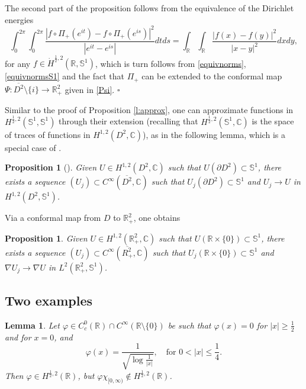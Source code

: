 \documentclass[12pt, a4paper]{article}
\newtheorem{lem}[thm]{Lemma}
\newtheorem{prop}[thm]{Proposition}
\newcommand{\sph}{\mathbb{S}}
\newcommand{\vp}{\varphi}
\newcommand{\R}{\mathbb{R}}
\newcommand{\cl}[1]{\overline{#1}}
\renewcommand{\(}{\left(}
\renewcommand{\)}{\right)}
\begin{document}
\medskip 


The second part of the proposition follows from the equivalence of the Dirichlet energies
$$\int_{0}^{2\pi}\int_{0}^{2\pi}\frac{|f\circ\Pi_+(e^{it})-f\circ\Pi_+(e^{is})|^2}{|e^{it}-e^{is}|}dtds=\int_\R\int_\R\frac{|f(x)-f(y)|^2}{|x-y|^2}dxdy,$$ for any   $f\in \dot H^{\frac12,2}(\R,\sph^1)$,
which is turn follows from \eqref{equivnorms}, \eqref{equivnormsS1} and the fact that $\Pi_+$ can be extended to the conformal map $\Psi: \cl{D^2}\setminus\{i\}\to \R^2_+$ given in \eqref{Psi}.
\hfill$\square$

\medskip

Similar to the proof of Proposition \ref{l:approx}, one can approzimate functions in $H^{\frac12,2}(\sph^1,\sph^1)$ through  their extension (recalling that $H^{\frac{1}{2},2}(\sph^1,\mathbb{C})$ is the space of traces of functions in $H^{1,2}(D^2,\mathbb{C})$), as in the following lemma, which is a special case of \cite[Lemma 8 and Lemma A.13]{BN}.

\begin{prop}[\cite{BN}]\label{l:approx2} Given $U\in H^{1,2}(D^2,\mathbb{C})$ such that $U(\partial D^2)\subset\sph^1$, there exists a sequence $(U_j)\subset C^\infty(\overline{D^2},\mathbb{C})$ such that $U_j(\partial D^2)\subset \sph^1$ and $U_j\to U$ in $H^{1,2}(D^2,\sph^1)$.
\end{prop}

Via a conformal map from $D$ to $\R^2_+$, one obtains

\begin{prop}\label{l:approx3} Given $U\in H^{1,2}(\R^2_+,\mathbb{C})$ such that $U(\R\times\{0\})\subset\sph^1$, there exists a sequence $(U_j)\subset C^\infty(\overline{R^2_+},\mathbb{C})$ such that $U_j(\R\times\{0\})\subset \sph^1$ and $\nabla U_j\to \nabla U$ in $L^2(\R^2_+,\sph^1)$.
\end{prop}





\subsection{Two examples}

\begin{lem}\label{l:example1}
Let $\vp\in C^0_c(\R)\cap C^\infty(\R\setminus \{0\})$  be such that $\varphi(x)=0$ for $|x|\ge \frac12$ and for $x=0$,  and  
 $$\vp(x)=\frac{1}{\sqrt{\log\frac{1}{|x|}}},\quad \text{for } 0<|x|\leq\frac14.$$
 Then $\varphi\in H^{\frac12,2}(\R)$,
but $\vp\chi_{[0,\infty)}\not\in H^{\frac12,2}(\R)$.
\end{lem} 
 
\end{document}
